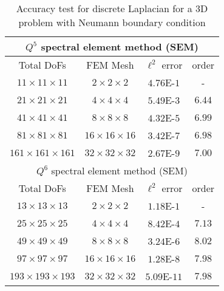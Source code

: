 \begin{table}[!ht]
    \centering
    \begin{tabular}{|c|c|c c|}
    \hline
    \multicolumn{4}{|c|}{$Q^5$ spectral element method (SEM)}\\
    \hline
    Total DoFs & FEM Mesh & $\ell^2$ error & order\\
    \hline
    $11\times 11\times 11$ & $2\times 2 \times 2$ & $4.76$E-$1$ & - \\
    \hline
    $21\times 21\times 21$ & $4\times 4 \times 4$ & $5.49$E-$3$ & $6.44$\\
    \hline
    $41\times 41\times 41$ & $8\times 8 \times 8$ & $4.32$E-$5$ & $6.99$ \\
    \hline
    $81\times 81\times 81$ & $16\times 16 \times 16$ & $3.42$E-$7$ & $6.98$ \\
    \hline
    $161\times 161\times 161$ & $32\times 32 \times 32$ & $2.67$E-$9$ & $7.00$ \\
    \hline
    \multicolumn{4}{|c|}{$Q^6$ spectral element method (SEM)}\\
    \hline
    Total DoFs & FEM Mesh & $\ell^2$ error & order\\
    \hline
    $13\times 13\times 13$ & $2\times 2 \times 2$ & $1.18$E-$1$ & - \\
    \hline
    $25\times 25\times 25$ & $4\times 4 \times 4$ & $8.42$E-$4$ & $7.13$ \\
    \hline
    $49\times 49\times 49$ & $8\times 8 \times 8$ & $3.24$E-$6$ & $8.02$ \\
    \hline
    $97\times 97\times 97$ & $16\times 16 \times 16$ & $1.28$E-$8$ & $7.98$ \\
    \hline
    $193\times 193\times 193$ & $32\times 32 \times 32$ & $5.09$E-$11$ & $7.98$ \\
    \hline
    \end{tabular}
    \caption{Accuracy test for discrete Laplacian for a 3D problem with Neumann boundary condition}
    \label{tab2:accuracy test neumann}
\end{table}

